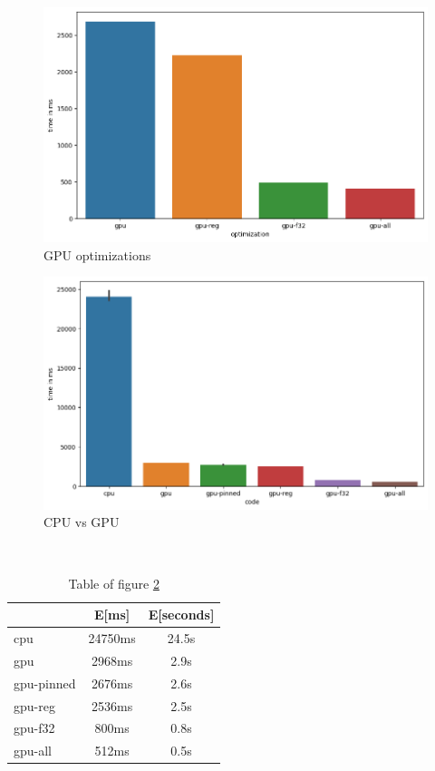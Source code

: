 \documentclass{article}
\begin{document}
\begin{figure}[H]
  \centering
  \includegraphics[width=0.98\linewidth]{run.png}
  \caption{GPU optimizations}
  \label{fig:optimizations}
\end{figure}

\begin{figure}[H]
  \centering
  \includegraphics[width=0.98\linewidth]{cpu_vs_gpu.png}
  \caption{CPU vs GPU}
  \label{fig:cpu_vs_gpu}
\end{figure}

\hfill\\

\begin{table}[H]
    \begin{center}
    \begin{tabular}{ |l|c|c|} 
     \hline
      & E[ms] & E[seconds] \\ \hline
      cpu & 24750ms & 24.5s   \\ \hline
      gpu  & 2968ms & 2.9s  \\ \hline
      gpu-pinned & 2676ms & 2.6s  \\ \hline
      gpu-reg  & 2536ms & 2.5s  \\ \hline  
      gpu-f32  & 800ms & 0.8s  \\ \hline  
      gpu-all  & 512ms & 0.5s  \\ \hline  
     \hline
    \end{tabular}
     \label{table:}
      \caption{Table of figure \ref{fig:cpu_vs_gpu}}
    \end{center}
   
\end{table}
\end{document}

